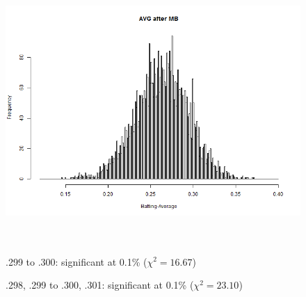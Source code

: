 \documentclass[dvipdfmx]{article}
\begin{document}
 \begin{figure}[H]
   \centering
   \includegraphics[width = 14cm, height = 10cm]
   {graphs/AVG_afmb}

   .299 to .300: significant at 0.1\% ($\chi^2 = 16.67$)

   .298, .299 to .300, .301: significant at 0.1\% ($\chi^2 = 23.10$)
 \end{figure}

 \begin{landscape}
   

   
 \end{landscape}

 \begin{landscape}
   

   
 \end{landscape}

 \begin{landscape}
   

   
 \end{landscape}


  
  

  \begin{landscape}
   
  \end{landscape}

  \begin{landscape}
    
  \end{landscape}
\end{document}
